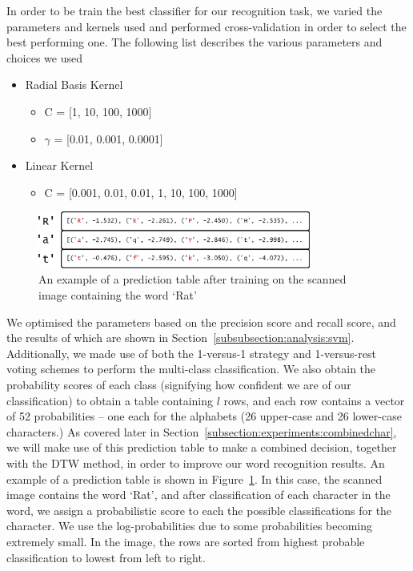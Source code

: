 \documentclass[12pt]{article}
\begin{document}
		In order to be train the best classifier for our recognition task, we varied the parameters and kernels used and performed cross-validation in order to select the best performing one. The following list describes the various parameters and choices we used

		\begin{itemize}
			\item Radial Basis Kernel
			\begin{itemize}
				\item C = [1, 10, 100, 1000]
				\item $\gamma$ = [0.01, 0.001, 0.0001]
			\end{itemize}
			\item Linear Kernel
			\begin{itemize}
				\item C = [0.001, 0.01, 0.01, 1, 10, 100, 1000]
			\end{itemize}
		\end{itemize}
		
		\begin{figure}[htbp!]
		\centering
		\includegraphics[width=0.8\textwidth]{svm_table.eps}
		\caption{An example of a prediction table after training on the scanned image containing the word `Rat'}
		\label{figure:svm_table}
		\end{figure}

		We optimised the parameters based on the precision score and recall score, and the results of which are shown in Section~\ref{subsubsection:analysis:svm}. Additionally, we made use of both the 1-versus-1 strategy and 1-versus-rest voting schemes to perform the multi-class classification. We also obtain the probability scores of each class (signifying how confident we are of our classification) to obtain a table containing $l$ rows, and each row contains a vector of 52 probabilities -- one each for the alphabets (26 upper-case and 26 lower-case characters.) As covered later in Section~\ref{subsection:experiments:combinedchar}, we will make use of this prediction table to make a combined decision, together with the DTW method, in order to improve our word recognition results. An example of a prediction table is shown in Figure~\ref{figure:svm_table}. In this case, the scanned image contains the word `Rat', and after classification of each character in the word, we assign a probabilistic score to each the possible classifications for the character. We use the log-probabilities due to some probabilities becoming extremely small. In the image, the rows are sorted from highest probable classification to lowest from left to right.
\end{document}
